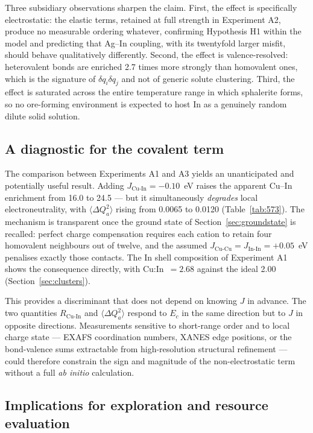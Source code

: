 \documentclass[11pt,a4paper]{article}
\newcommand{\dQ}{\Delta Q}
\newcommand{\RCuIn}{R_{\mathrm{Cu\text{-}In}}}
\begin{document}
Three subsidiary observations sharpen the claim. First, the effect is
specifically electrostatic: the elastic terms, retained at full strength in
Experiment A2, produce no measurable ordering whatever, confirming Hypothesis H1
within the model and predicting that Ag--In coupling, with its twentyfold larger
misfit, should behave qualitatively differently. Second, the effect is
valence-resolved: heterovalent bonds are enriched 2.7 times more strongly than
homovalent ones, which is the signature of $\delta q_i \delta q_j$ and not of
generic solute clustering. Third, the effect is saturated across the entire
temperature range in which sphalerite forms, so no ore-forming environment is
expected to host In as a genuinely random dilute solid solution.

\subsection{A diagnostic for the covalent term}
\label{sec:jdiagnostic}

The comparison between Experiments A1 and A3 yields an unanticipated and
potentially useful result. Adding $J_{\mathrm{Cu\text{-}In}} = -0.10$~eV raises
the apparent Cu--In enrichment from 16.0 to 24.5 --- but it simultaneously
\emph{degrades} local electroneutrality, with $\langle \dQ_a^2 \rangle$ rising
from 0.0065 to 0.0120 (Table~\ref{tab:573}). The mechanism is transparent once
the ground state of Section~\ref{sec:groundstate} is recalled: perfect charge
compensation requires each cation to retain four homovalent neighbours out of
twelve, and the assumed
$J_{\mathrm{Cu\text{-}Cu}} = J_{\mathrm{In\text{-}In}} = +0.05$~eV penalises
exactly those contacts. The In shell composition of Experiment A1 shows the
consequence directly, with Cu:In~$= 2.68$ against the ideal 2.00
(Section~\ref{sec:clusters}).

This provides a discriminant that does not depend on knowing $J$ in advance. The
two quantities $\RCuIn$ and $\langle \dQ_a^2 \rangle$ respond to $E_c$ in the
same direction but to $J$ in opposite directions. Measurements sensitive to
short-range order and to local charge state --- EXAFS coordination numbers,
XANES edge positions, or the bond-valence sums extractable from high-resolution
structural refinement --- could therefore constrain the sign and magnitude of the
non-electrostatic term without a full \textit{ab initio} calculation.

\subsection{Implications for exploration and resource evaluation}
\label{sec:exploration}
\end{document}
